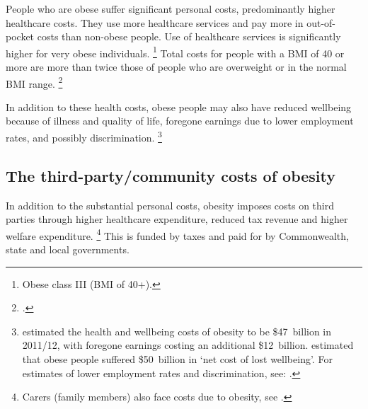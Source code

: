 \documentclass[embargoed]{grattan}
\begin{document}
People who are obese suffer significant personal costs, predominantly higher healthcare costs.
They use more healthcare services and pay more in out-of-pocket costs than non-obese people.
Use of healthcare services is significantly higher for very obese individuals.%
\footnote{Obese class III (BMI of 40+).} 
Total costs for people with a BMI of 40 or more are more than twice those of people who are overweight or in the normal BMI range.%
\footcites{PwC2015Weighingcostobesity}{Park2012impactchildhoodobesity}{Australia2014NoTimeWeight}

In addition to these health costs, obese people may also have reduced wellbeing because of illness and quality of life, foregone earnings due to lower employment rates, and possibly discrimination.%
\footnote{\textcite{PwC2015Weighingcostobesity} estimated the health and wellbeing costs of obesity to be \$47~billion in 2011/12, with foregone earnings costing an additional \$12~billion. \textcite{Economics2008growingcostobesity} estimated that obese people suffered \$50~billion in `net cost of lost wellbeing'.
For estimates of lower employment rates and discrimination, see: \textcites{Rooth2009Obesityattractivenessdifferential}{Boeckerman2016EffectWeightLabor}{Reichert2015Obesityweightloss}{Cawley2015economyscalesselective}.}

\subsection{The third-party/community costs of obesity}\label{the-third-partysocial-costs-of-obesity}

In addition to the substantial personal costs, obesity imposes costs on third parties through higher healthcare expenditure, reduced tax revenue and higher welfare expenditure.%
\footnote{Carers (family members) also face costs due to obesity, see \textcite{Freebairn2010Taxationobesity}.} This is funded by taxes and paid for by Commonwealth, state and local governments.
\end{document}
